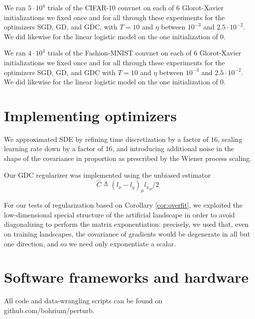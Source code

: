 \documentclass[openany, notitlepage, justified]{tufte-book}
\theoremstyle{plain}
\theoremstyle{definition}
\begin{document}
            We ran $5 \cdot 10^4$ trials of the CIFAR-10 convnet on each of $6$
            Glorot-Xavier initializations we fixed once and for all through
            these experiments for the optimizers SGD, GD, and GDC, with $T=10$
            and $\eta$ between $10^{-3}$ and $2.5 \cdot 10^{-2}$.  We did
            likewise for the linear logistic model on the one initialization of
            $0$.

            We ran $4 \cdot 10^4$ trials of the Fashion-MNIST convnet on each
            of $6$ Glorot-Xavier initializations we fixed once and for all
            through these experiments for the optimizers SGD, GD, and GDC with
            $T=10$ and $\eta$ between $10^{-3}$ and $2.5 \cdot 10^{-2}$.  We
            did likewise for the linear logistic model on the one
            initialization of $0$. 

    \section{Implementing optimizers}                            \label{appendix:optimizers}

        We approximated SDE by refining time discretization by a factor of
        $16$, scaling learning rate down by a factor of $16$, and introducing
        additional noise in the shape of the covariance in proportion as
        prescribed by the Wiener process scaling.

        Our GDC regularizer was implemented using the unbiased estimator
        $$
            \hat{C} \triangleq (l_x - l_y)_\mu {l_x}_\nu / 2
        $$
        
        For our tests of regularization based on Corollary \ref{cor:overfit},
        we exploited the low-dimensional special structure of the artificial
        landscape in order to avoid diagonalizing to perform the matrix
        exponentiation: precisely, we used that, even on training landscapes,
        the covariance of gradients would be degenerate in all but one
        direction, and so we need only exponentiate a scalar.

    \section{Software frameworks and hardware}                   \label{appendix:frameworks}

        All code and data-wrangling scripts can be found on
        {\color{mooteal}github.com/bohrium/perturb}.
\end{document}
